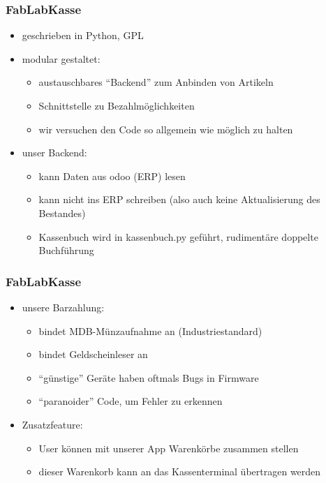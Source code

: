 \documentclass[t]{beamer}
\begin{document}
\begin{frame}
\frametitle{FabLabKasse}
 \begin{itemize}
  \item geschrieben in Python, GPL
  \item modular gestaltet:
    \begin{itemize}
     \item austauschbares \enquote{Backend} zum Anbinden von Artikeln
     \item Schnittstelle zu Bezahlmöglichkeiten
     \item wir versuchen den Code so allgemein wie möglich zu halten
    \end{itemize}
  \item unser Backend:
    \begin{itemize}
      \item kann Daten aus odoo (ERP) lesen
      \item kann nicht ins ERP schreiben (also auch keine Aktualisierung des Bestandes)
      \item Kassenbuch wird in kassenbuch.py geführt, rudimentäre doppelte Buchführung
    \end{itemize}
  \end{itemize}
\end{frame}
\begin{frame}
\frametitle{FabLabKasse}
  \begin{itemize}
  \item unsere Barzahlung:
     \begin{itemize}
        \item bindet MDB-Münzaufnahme an (Industriestandard)
        \item bindet Geldscheinleser an
        \item \enquote{günstige} Geräte haben oftmals Bugs in Firmware
        \item[$\rightarrow$] \enquote{paranoider} Code, um Fehler zu erkennen
     \end{itemize}
  \item Zusatzfeature:
     \begin{itemize}
       \item User können mit unserer App Warenkörbe zusammen stellen
       \item dieser Warenkorb kann an das Kassenterminal übertragen werden
     \end{itemize} 
 \end{itemize}
\end{frame}
\end{document}
